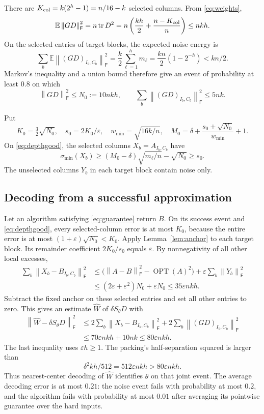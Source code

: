 \documentclass[11pt]{article}
\theoremstyle{remark}
\newcommand{\E}{\mathbb E}
\newcommand{\F}{\mathsf F}
\newcommand{\OPT}{\operatorname{OPT}}
\newcommand{\tr}{\operatorname{tr}}
\newcommand{\eps}{\varepsilon}
\newcommand{\norm}[1]{\left\lVert #1\right\rVert}
\begin{document}
There are $K_{\rm col}=k(2^h-1)=n/16-k$ selected columns. From
\eqref{eq:weights},
\[
 \E\norm{GD}_\F^2
 =n\tr D^2=n\left(\frac{kh}{2}+\frac{n-K_{\rm col}}n\right)\le nkh.
\]
On the selected entries of target blocks, the expected noise energy is
\begin{equation}\label{eq:targetnoise}
 \sum_b\E\norm{(GD)_{I_b,C_b}}_\F^2
 =\frac{k}{2}\sum_{\ell=1}^h m_\ell
 =\frac{kn}{2}(1-2^{-h})<kn/2.
\end{equation}
Markov's inequality and a union bound therefore give an event of probability
at least $0.8$ on which
\begin{equation}\label{eq:depthgood}
 \norm{GD}_\F^2\le N_0:=10nkh,
 \qquad \sum_b\norm{(GD)_{I_b,C_b}}_\F^2\le5nk.
\end{equation}

Put
\[
 K_0=\tfrac32\sqrt{N_0},\quad s_0=2K_0/\eps,
 \quad w_{\min}=\sqrt{16k/n},
 \quad M_0=\delta+\frac{s_0+\sqrt{N_0}}{w_{\min}}+1.
\]
On \eqref{eq:depthgood}, the selected columns $X_b=A_{I_b,C_b}$ have
\[
 \sigma_{\min}(X_b)
 \ge(M_0-\delta)\sqrt{m_\ell/n}-\sqrt{N_0}\ge s_0.
\]
The unselected columns $Y_b$ in each target block contain noise only.

\subsection{Decoding from a successful approximation}

Let an algorithm satisfying \eqref{eq:guarantee} return $B$.
On its success event and \eqref{eq:depthgood}, every selected-column error is
at most $K_0$, because the entire error is at most
$(1+\eps)\sqrt{N_0}<K_0$. Apply Lemma~\ref{lem:anchor} to each target block.
Its remainder coefficient $2K_0/s_0$ equals $\eps$.
By nonnegativity of all other local excesses,
\begin{align}\label{eq:selectederror}
 \sum_b\norm{X_b-B_{I_b,C_b}}_\F^2
 &\le\bigl(\norm{A-B}_\F^2-\OPT(A)^2\bigr)
       +\eps\sum_b\norm{Y_b}_\F^2\\
 &\le(2\eps+\eps^2)N_0+\eps N_0
 \le35\eps nkh.\nonumber
\end{align}
Subtract the fixed anchor on these selected entries and set all other entries
to zero. This gives an estimate $\widehat W$ of $\delta S_\theta D$ with
\begin{align}\label{eq:depthradius}
 \norm{\widehat W-\delta S_\theta D}_\F^2
 &\le2\sum_b\norm{X_b-B_{I_b,C_b}}_\F^2
       +2\sum_b\norm{(GD)_{I_b,C_b}}_\F^2\\
 &\le70\eps nkh+10nk\le80\eps nkh.\nonumber
\end{align}
The last inequality uses $\eps h\ge1$.
The packing's half-separation squared is larger than
\[
 \delta^2kh/512=512\eps nkh>80\eps nkh.
\]
Thus nearest-center decoding of $\widehat W$ identifies $\theta$ on that
joint event. The average decoding error is at most $0.21$: the noise event
fails with probability at most $0.2$, and the algorithm fails with probability
at most $0.01$ after averaging its pointwise guarantee over the hard inputs.
\end{document}
